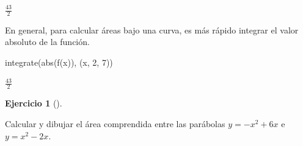\documentclass[
  a4paper,
]{scrreport}
\newenvironment{Shaded}{\begin{snugshade}}{\end{snugshade}}
\newcommand{\FloatTok}[1]{\textcolor[rgb]{0.68,0.00,0.00}{#1}}
\newcommand{\FunctionTok}[1]{\textcolor[rgb]{0.28,0.35,0.67}{#1}}
\newcommand{\NormalTok}[1]{\textcolor[rgb]{0.00,0.23,0.31}{#1}}
\theoremstyle{definition}
\newtheorem{exercise}{Ejercicio}[chapter]
\theoremstyle{remark}
\begin{document}
\begin{tcolorbox}
$\frac{43}{2}$

\end{tcolorbox}

\begin{tcolorbox}[enhanced jigsaw, bottomtitle=1mm, rightrule=.15mm, left=2mm, colback=white, title=\textcolor{quarto-callout-tip-color}{\faLightbulb}\hspace{0.5em}{Solución 2}, bottomrule=.15mm, colframe=quarto-callout-tip-color-frame, toprule=.15mm, leftrule=.75mm, opacityback=0, coltitle=black, breakable, colbacktitle=quarto-callout-tip-color!10!white, arc=.35mm, toptitle=1mm, titlerule=0mm, opacitybacktitle=0.6]

En general, para calcular áreas bajo una curva, es más rápido integrar
el valor absoluto de la función.

\begin{Shaded}
\begin{Highlighting}[]
\FunctionTok{integrate}\NormalTok{(}\FunctionTok{abs}\NormalTok{(}\FunctionTok{f}\NormalTok{(x)), (x, }\FloatTok{2}\NormalTok{, }\FloatTok{7}\NormalTok{))}
\end{Highlighting}
\end{Shaded}

$\frac{43}{2}$

\end{tcolorbox}

\begin{exercise}[]\protect\hypertarget{exr-area-dos-funciones}{}\label{exr-area-dos-funciones}

Calcular y dibujar el área comprendida entre las parábolas \(y=-x^2+6x\)
e \(y=x^2-2x\).

\end{exercise}
\end{document}

